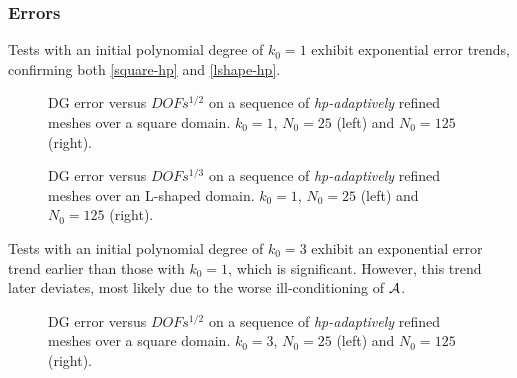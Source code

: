 \newpage
\subsubsection{Errors}

Tests with an initial polynomial degree of $k_0 = 1$ exhibit exponential error trends, confirming both \eqref{square-hp} and \eqref{lshape-hp}.

\begin{figure}[!ht]
    \begin{subfigure}[b]{0.45\textwidth}
		
	\end{subfigure}
	\hfill
	\begin{subfigure}[b]{0.45\textwidth}
		
	\end{subfigure}
    \caption{DG error versus $DOFs^{1/2}$ on a sequence of \textit{hp-adaptively} refined meshes over a square domain. $k_0 = 1$, $N_0 = 25$ (left) and $N_0 = 125$ (right).}
\end{figure}

\begin{figure}[!ht]
    \begin{subfigure}[b]{0.45\textwidth}
		
	\end{subfigure}
	\hfill
	\begin{subfigure}[b]{0.45\textwidth}
		
	\end{subfigure}
    \caption{DG error versus $DOFs^{1/3}$ on a sequence of \textit{hp-adaptively} refined meshes over an L-shaped domain. $k_0 = 1$, $N_0 = 25$ (left) and $N_0 = 125$ (right).}
\end{figure}

\newpage

Tests with an initial polynomial degree of $k_0 = 3$ exhibit an exponential error trend earlier than those with $k_0 = 1$, which is significant. However, this trend later deviates, most likely due to the worse ill-conditioning of $\mathcal{A}$.

\begin{figure}[!ht]
    \begin{subfigure}[b]{0.45\textwidth}
		
	\end{subfigure}
	\hfill
	\begin{subfigure}[b]{0.45\textwidth}
		
	\end{subfigure}
    \caption{DG error versus $DOFs^{1/2}$ on a sequence of \textit{hp-adaptively} refined meshes over a square domain. $k_0 = 3$, $N_0 = 25$ (left) and $N_0 = 125$ (right).}
\end{figure}

